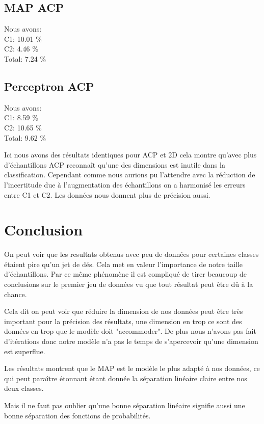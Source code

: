 \documentclass[10pt]{article}
\begin{document}
\subsection{MAP ACP}
Nous avons:\\
C1: 10.01 \% \\
C2: 4.46 \%\\
Total: 7.24 \%
\subsection{Perceptron ACP}
Nous avons:\\
C1: 8.59 \% \\
C2: 10.65 \%\\
Total: 9.62 \%

Ici nous avons des résultats identiques pour ACP et 2D cela montre qu'avec plus d'échantillons
ACP reconnaît qu'une des dimensions est inutile dans la classification.
Cependant comme nous aurions pu l'attendre avec la réduction de l'incertitude due à
l'augmentation des échantillons on a harmonisé les erreurs entre C1 et C2.
Les données nous donnent plus de précision aussi.

\section{Conclusion}

On peut voir que les resultats obtenus avec peu de données pour certaines classes étaient pire qu'un jet de dés.
Cela met en valeur l'importance de notre taille d'échantillons. Par ce même phénomène il est compliqué de tirer beaucoup de conclusions
sur le premier jeu de données vu que tout résultat peut être dû à la chance.

Cela dit on peut voir que réduire la dimension de nos données peut être très important pour la précision des résultats,
une dimension en trop ce sont des données en trop que le modèle doit "accommoder". De plus
nous n'avons pas fait d'itérations donc notre modèle n'a pas le temps de s'apercevoir qu'une dimension
est superflue.

Les résultats montrent que le MAP est le modèle le plus adapté à nos données,
ce qui peut paraître étonnant étant donnée la séparation linéaire claire entre nos deux
classes.

Mais il ne faut pas oublier qu'une bonne séparation linéaire signifie aussi une bonne séparation
des fonctions de probabilités.
\end{document}
